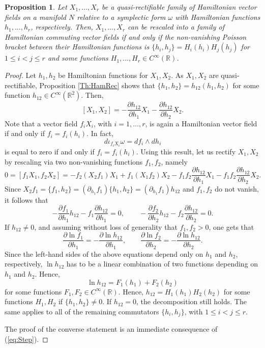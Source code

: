 \documentclass[12pt]{article}
\theoremstyle{plain}
\newtheorem{proposition}[theorem]{Proposition}
\theoremstyle{definition}
\numberwithin{equation}{section}
\begin{document}
\begin{proposition} Let $X_1,\ldots,X_r$ be a quasi-rectifiable family of Hamiltonian vector fields on a manifold $N$ relative to a symplectic form $\omega$ with Hamiltonian functions $h_1,\ldots,h_r$, respectively. Then, $X_1,\ldots,X_r$ can be rescaled into a family of Hamiltonian commuting vector fields if and only if the non-vanishing Poisson bracket between their Hamiltonian functions is $\{h_i,h_j\}=H_i(h_i)H_j(h_j)$ for $1\leq i<j\leq r$  and some functions $H_1,\ldots,H_r\in C^\infty(\mathbb{R})$.
\end{proposition}
\begin{proof} Let $h_1,h_2$ be Hamiltonian functions for $X_1,X_2$. As $X_1,X_2$ are quasi-rectifiable, Proposition \ref{Th:HamRec} shows that
$\{h_1,h_2\}=h_{12}(h_1,h_2)$ for some function $h_{12}\in C^\infty(\mathbb{R}^2)$. Then,
$$
[X_1,X_2]=-\frac{\partial h_{12}}{\partial h_1}X_1-\frac{\partial h_{12}}{\partial h_2}X_2.
$$
Note that a vector field $f_iX_i$, with $i=1,\ldots,r$, is again a Hamiltonian vector field if and only if $f_i=f_i(h_i)$. In fact,
$$
d\iota_{f_iX_i}\omega=df_i\wedge dh_i
$$
is equal to zero if and only if $f_i=f_i(h_i)$. Using this result, let us rectify $X_1,X_2$ by rescaling via two non-vanishing functions $f_1,f_2$, namely
$$
0=[f_1X_1,f_2X_2]=-f_2(X_2f_1)X_1+f_1(X_1f_2)X_2-f_1f_2\frac{\partial h_{12}}{\partial h_1}X_1-f_1f_2\frac{\partial h_{12}}{\partial h_2}X_2.
$$
Since $X_2f_1=\{f_1,h_2\}=(\partial_{h_1}f_1)\{h_1,h_2\}=(\partial_{h_1}f_1)h_{12}$ and $f_1,f_2$ do not vanish, it follows that
$$
-\frac{\partial f_1}{\partial h_1}h_{12}-f_1\frac{\partial h_{12}}{\partial h_1}=0,\qquad -\frac{\partial f_2}{\partial h_2}h_{12}-f_2\frac{\partial h_{12}}{\partial h_2}=0.
$$
If $h_{12}\neq 0$, and assuming without loss of generality that $f_1,f_2>0$, one gets that
\begin{equation}\label{eq:Step}
\frac{\partial \ln f_1}{\partial h_1}=-\frac{\partial \ln h_{12}}{\partial h_1},\qquad \frac{\partial\ln f_2}{\partial h_2}=-\frac{\partial \ln h_{12}}{\partial h_2}.
\end{equation}
Since the left-hand sides of the above equations depend only on $h_1$ and $h_2$, respectively, $\ln h_{12}$ has to be a linear combination of two functions depending on $
h_1$ and $h_2$. Hence,
$$
\ln h_{12}=F_1(h_1)+F_2(h_2)
$$
for some functions $F_1,F_2\in C^\infty(\mathbb{R})$. Hence, $h_{12}=H_1(h_1)H_2(h_2)$ for some functions $H_1,H_2$ if $
\{h_1,h_2
\}\neq 0$. If $h_{12}=0$, the decomposition still holds. The same applies to all  of the remaining commutators $\{h_i,h_j\}$, with $1\leq i<j\leq r$.

The proof of the converse statement is an immediate consequence of (\ref{eq:Step}).
\end{proof}
\end{document}
